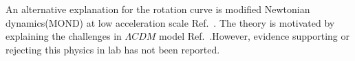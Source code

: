 An alternative explanation for the rotation curve is modified Newtonian dynamics(MOND) at low acceleration scale Ref.~\cite{Milgrom1983, Milgrom1983a, Milgrom1983b}. The theory is motivated by explaining the challenges in $\Lambda CDM$ model Ref.~\cite{Famaey2012}.However, evidence supporting or rejecting this physics in lab has not been reported. 

